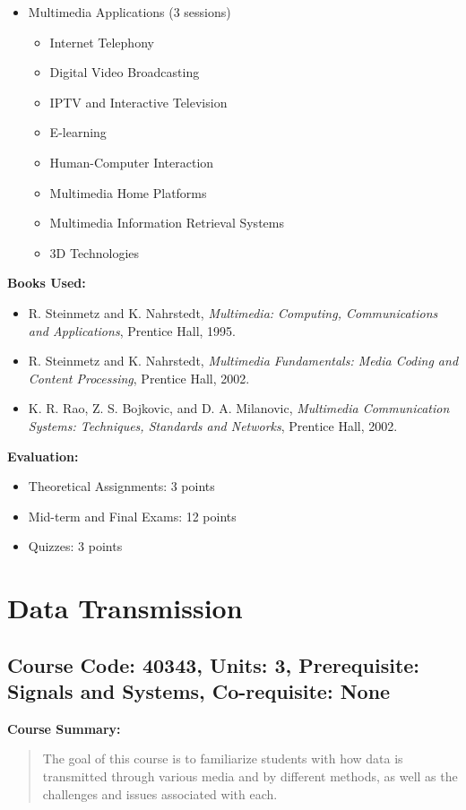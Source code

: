 \documentclass[12pt]{article}
\begin{document}
\begin{itemize}
    \item Multimedia Applications (3 sessions)
    \begin{itemize}
        \item Internet Telephony
        \item Digital Video Broadcasting
        \item IPTV and Interactive Television
        \item E-learning
        \item Human-Computer Interaction
        \item Multimedia Home Platforms
        \item Multimedia Information Retrieval Systems
        \item 3D Technologies
    \end{itemize}
\end{itemize}

\textbf{Books Used:}
\begin{itemize}
    \item R. Steinmetz and K. Nahrstedt, \textit{Multimedia: Computing, Communications and Applications}, Prentice Hall, 1995.
    \item R. Steinmetz and K. Nahrstedt, \textit{Multimedia Fundamentals: Media Coding and Content Processing}, Prentice Hall, 2002.
    \item K. R. Rao, Z. S. Bojkovic, and D. A. Milanovic, \textit{Multimedia Communication Systems: Techniques, Standards and Networks}, Prentice Hall, 2002.
\end{itemize}

\textbf{Evaluation:}
\begin{itemize}
    \item Theoretical Assignments: 3 points
    \item Mid-term and Final Exams: 12 points
    \item Quizzes: 3 points
\end{itemize}

\newpage

\section{Data Transmission}
\subsection*{Course Code: 40343, Units: 3, Prerequisite: Signals and Systems, Co-requisite: None}

\textbf{Course Summary:} 
\begin{quote}
   The goal of this course is to familiarize students with how data is transmitted through various media and by different methods, as well as the challenges and issues associated with each.
\end{quote}
\end{document}
